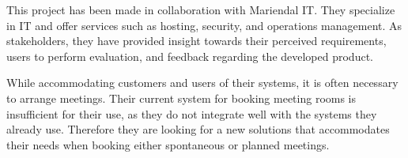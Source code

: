 This project has been made in collaboration with Mariendal IT.
They specialize in IT and offer services such as hosting, security, and operations management. 
As stakeholders, they have provided insight towards their perceived requirements, users to perform evaluation, and feedback regarding the developed product.


While accommodating customers and users of their systems, it is often necessary to arrange meetings.
Their current system for booking meeting rooms is insufficient for their use, as they do not integrate well with the systems they already use.
Therefore they are looking for a new solutions that accommodates their needs when booking either spontaneous or planned meetings. 
